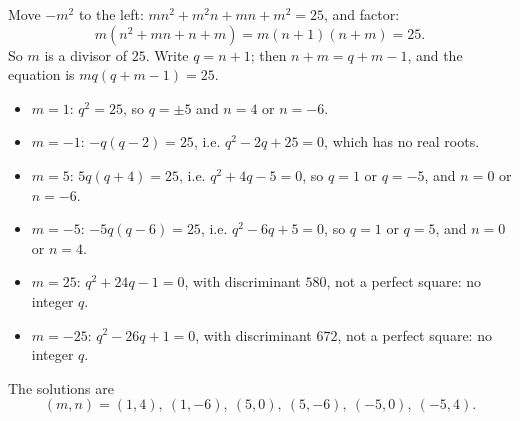 Move $-m^2$ to the left: $mn^2+m^2n+mn+m^2=25$, and factor:
\[m\left(n^2+mn+n+m\right)=m(n+1)(n+m)=25.\]
So $m$ is a divisor of $25$. Write $q=n+1$; then $n+m=q+m-1$, and the equation is $mq(q+m-1)=25$.
\begin{itemize}
\item $m=1$: $q^2=25$, so $q=\pm5$ and $n=4$ or $n=-6$.
\item $m=-1$: $-q(q-2)=25$, i.e. $q^2-2q+25=0$, which has no real roots.
\item $m=5$: $5q(q+4)=25$, i.e. $q^2+4q-5=0$, so $q=1$ or $q=-5$, and $n=0$ or $n=-6$.
\item $m=-5$: $-5q(q-6)=25$, i.e. $q^2-6q+5=0$, so $q=1$ or $q=5$, and $n=0$ or $n=4$.
\item $m=25$: $q^2+24q-1=0$, with discriminant $580$, not a perfect square: no integer $q$.
\item $m=-25$: $q^2-26q+1=0$, with discriminant $672$, not a perfect square: no integer $q$.
\end{itemize}
The solutions are
\[\boxed{(m,n)=(1,4),\ (1,-6),\ (5,0),\ (5,-6),\ (-5,0),\ (-5,4)}.\]
